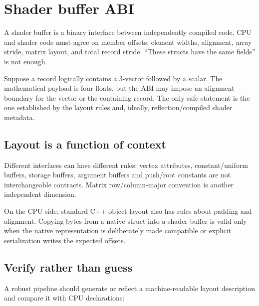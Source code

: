 \hypertarget{appendix-749048795dbb}{}\label{referencestart:appendix-749048795dbb}
\section{Shader buffer ABI}\label{appendix-749048795dbb-shader-buffer-abi}

\hypertarget{appendix-749048795dbb-shader-buffer-abi}{}

A shader buffer is a binary interface between independently compiled code. CPU and shader code must agree on member offsets, element widths, alignment, array stride, matrix layout, and total record stride. ``These structs have the same fields'' is not enough.

Suppose a record logically contains a 3-vector followed by a scalar. The mathematical payload is four floats, but the ABI may impose an alignment boundary for the vector or the containing record. The only safe statement is the one established by the layout rules and, ideally, reflection/compiled shader metadata.

\subsection{Layout is a function of context}\label{appendix-749048795dbb-layout-is-a-function-of-context}

\hypertarget{appendix-749048795dbb-layout-is-a-function-of-context}{}

Different interfaces can have different rules: vertex attributes, constant/uniform buffers, storage buffers, argument buffers and push/root constants are not interchangeable contracts. Matrix row/column-major convention is another independent dimension.

On the CPU side, standard C++ object layout also has rules about padding and alignment. Copying bytes from a native struct into a shader buffer is valid only when the native representation is deliberately made compatible or explicit serialization writes the expected offsets.

\subsection{Verify rather than guess}\label{appendix-749048795dbb-verify-rather-than-guess}

\hypertarget{appendix-749048795dbb-verify-rather-than-guess}{}

A robust pipeline should generate or reflect a machine-readable layout description and compare it with CPU declarations:

